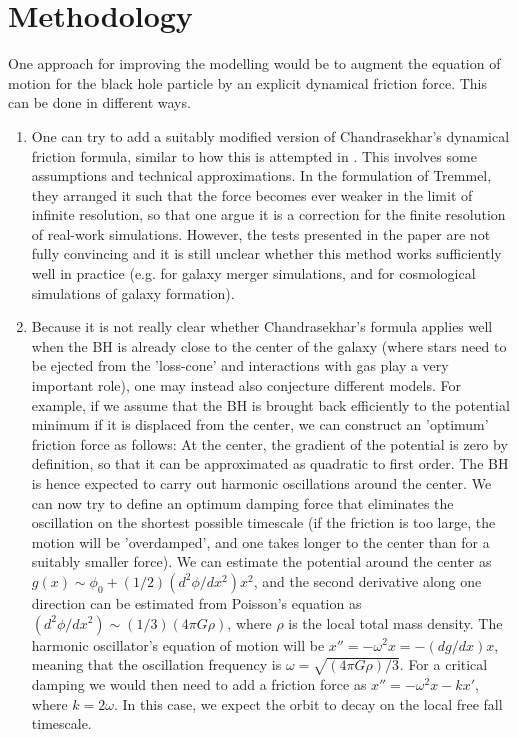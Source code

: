 \documentclass[a4,useAMS,usenatbib,usegraphicx,12pt]{article}
\begin{document}
\section{Methodology}


One approach for improving the modelling would be to augment the equation of 
motion for the black hole particle by an explicit dynamical friction force. 
This can be done in different ways.

\begin{enumerate}
 
\item One can try to add a suitably modified version of Chandrasekhar's 
dynamical friction formula, similar to how this is attempted in \citet{Tremmel2015}. 
This involves some assumptions and technical approximations. In the formulation 
of Tremmel, they arranged it such that the force becomes ever weaker in the 
limit of infinite resolution, so that one argue it is a correction for the finite 
resolution of real-work simulations. However, the tests presented in the paper 
are not fully convincing and it is still unclear whether this method works 
sufficiently well in practice (e.g. for galaxy merger simulations, and for 
cosmological simulations of galaxy formation).

\item Because it is not really clear whether Chandrasekhar's formula applies 
well when the BH is already close to the center of the galaxy (where stars need 
to be ejected from the 'loss-cone' and interactions with gas play a very important
role), one may instead also conjecture different models. For example, if we assume
that the BH is brought back efficiently to the potential minimum if it is 
displaced from the center, we can construct an 'optimum' friction force as 
follows: At the center, the gradient of the potential is zero by definition, so 
that it can be approximated as quadratic to first order. The BH is hence expected 
to carry out harmonic oscillations around the center. We can now try to define 
an optimum damping force that eliminates the oscillation on the shortest possible 
timescale (if the friction is too large, the motion will be 'overdamped', and 
one takes longer to the center than for a suitably smaller force). We can 
estimate the potential around the center as $g(x) \sim \phi_0 + (1/2) (d^2\phi
/dx^2) x^2$, and the second derivative
along one direction can be estimated from Poisson's equation as $(d^2\phi/dx^2) 
\sim (1/3) (4 \pi G \rho)$, where $\rho$ is the local total mass density. The 
harmonic oscillator's equation of motion will be $x'' = - \omega^2 x = - (dg/dx) x$, 
meaning that the oscillation frequency is $\omega = \sqrt{(4 \pi G \rho)/3}$. 
For a critical damping we would then need to add a friction force as $x'' = 
-\omega^2 x - k x'$, where $k = 2 \omega$. In this case, we expect the orbit to 
decay on the local free fall timescale.

\end{enumerate}
\end{document}
